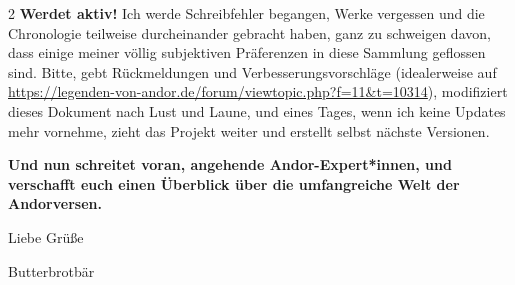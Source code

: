 \documentclass[10pt, a4paper, oneside]{book}
\begin{document}
\begin{multicols}{2}
\textbf{Werdet aktiv!} Ich werde Schreibfehler begangen, Werke vergessen und die Chronologie teilweise durcheinander gebracht haben, ganz zu schweigen davon, dass einige meiner völlig subjektiven Präferenzen in diese Sammlung geflossen sind. Bitte, gebt Rückmeldungen und Verbesserungsvorschläge (idealerweise auf \url{https://legenden-von-andor.de/forum/viewtopic.php?f=11&t=10314}), modifiziert dieses Dokument nach Lust und Laune, und eines Tages, wenn ich keine Updates mehr vornehme, zieht das Projekt weiter und erstellt selbst nächste Versionen.\bigskip

\textbf{Und nun schreitet voran, angehende Andor-Expert*innen, und verschafft euch einen Überblick über die umfangreiche Welt der Andorversen.}\bigskip

Liebe Grüße

Butterbrotbär



\end{multicols}
\end{document}

